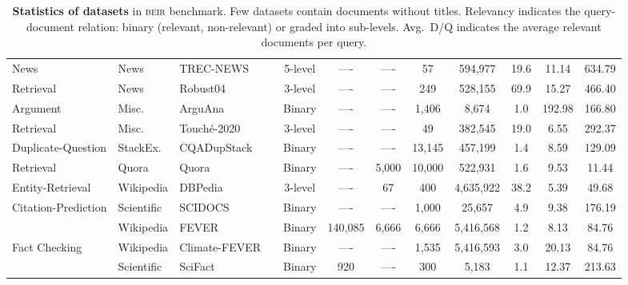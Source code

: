 \documentclass{article}
\newcommand{\cmark}{\color{mygray}\ding{51}}\newcommand{\xmark}{\color{mygray}\ding{55}}
\newcommand{\custo}[1]{\textsc{\normalsize #1}}
\newcommand{\beir}{\custo{beir}\xspace}
\begin{document}
\begin{table*}[t!]
{\begin{tabular}{ l | l | l | c | c | c | c | c c c | c c }
    News      &News& TREC-NEWS  \cite{soboroff2019trec}    & \cmark & 5-level &   ----    &   ----  & 57     & 594,977 & 19.6 & 11.14  & 634.79  \\
    Retrieval      &News& Robust04 \cite{96071}    & \xmark & 3-level &   ----    &   ----  & 249   & 528,155 & 69.9 & 15.27  & 466.40  \\ \midrule
    Argument       & Misc. & ArguAna  \cite{wachsmuth:2018a}    & \cmark & Binary  &   ----    &   ----  & 1,406  & 8,674     & 1.0  & 192.98& 166.80 \\
    Retrieval   & Misc. & Touch\'e-2020 \cite{stein:2020v} & \cmark & 3-level &   ----    &   ----  & 49     & 382,545   & 19.0 & 6.55  & 292.37 \\ \midrule
    Duplicate-Question   &StackEx.& CQADupStack \cite{hoogeveen2015cqadupstack}  & \cmark & Binary  &   ----    &   ----  & 13,145 & 457,199   & 1.4  & 8.59  & 129.09 \\
    Retrieval            & Quora &  Quora        & \xmark & Binary  &   ----    & 5,000 & 10,000 & 522,931   & 1.6  & 9.53  & 11.44  \\ \midrule
    Entity-Retrieval     & Wikipedia  &  DBPedia  \cite{Hasibi:2017:DVT}     & \cmark & 3-level &   ----    &   67  & 400    & 4,635,922 & 38.2 & 5.39  & 49.68  \\ \midrule
    Citation-Prediction  & Scientific&  SCIDOCS  \cite{cohan-etal-2020-specter}     & \cmark & Binary  &   ----    &   ----  & 1,000  & 25,657    & 4.9  & 9.38  & 176.19 \\ \midrule
                         & Wikipedia  &  FEVER \cite{thorne-etal-2018-fever}       & \cmark & Binary  & 140,085 & 6,666 & 6,666  & 5,416,568 & 1.2  & 8.13  & 84.76  \\ 
    Fact Checking        & Wikipedia  & Climate-FEVER \cite{diggelmann2020climatefever} & \cmark & Binary  &   ----    &   ----  & 1,535  & 5,416,593 & 3.0  & 20.13 & 84.76  \\
                         & Scientific & SciFact  \cite{wadden-etal-2020-fact}     & \cmark & Binary  &   920      &   ----  &  300   & 5,183     & 1.1  & 12.37 & 213.63  \\
    \bottomrule
    \end{tabular}}
    \vspace{-2mm} 
    \caption{\textbf{Statistics of datasets} in \beir benchmark. Few datasets contain documents without titles. Relevancy indicates the query-document relation: binary (relevant, non-relevant) or graded into sub-levels. Avg.~D/Q indicates the average relevant documents per query. \vspace{-5mm}}
    \label{tab:dataset_stats}
\end{table*}
\end{document}
